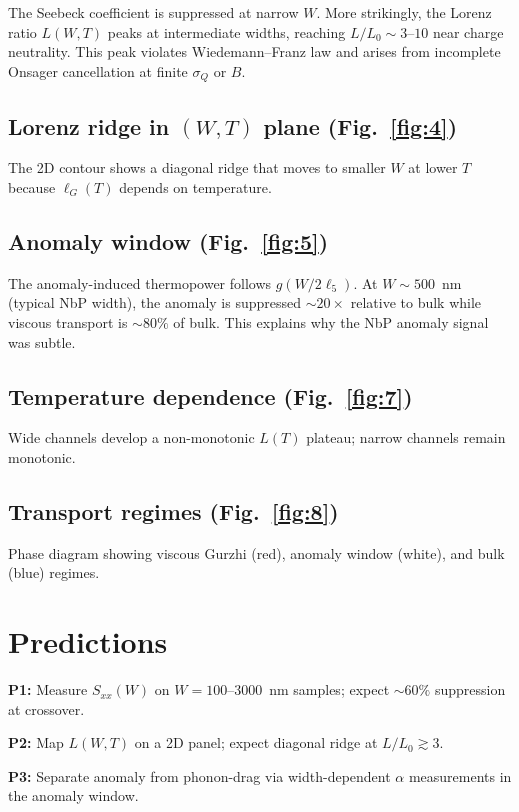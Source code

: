 \documentclass[twocolumn,11pt]{article}
\begin{document}
The Seebeck coefficient is suppressed at narrow $W$. More strikingly, the Lorenz 
ratio $L(W,T)$ peaks at intermediate widths, reaching $L/L_0 \sim 3$--$10$ near charge 
neutrality. This peak violates Wiedemann--Franz law and arises from incomplete Onsager 
cancellation \citep{Messica2023} at finite $\sigma_Q$ or $B$.

\subsection{Lorenz ridge in $(W,T)$ plane (Fig.~\ref{fig:4})}

The 2D contour shows a diagonal ridge that moves to smaller $W$ at lower $T$ because 
$\ell_G(T)$ depends on temperature.

\subsection{Anomaly window (Fig.~\ref{fig:5})}

The anomaly-induced thermopower follows $g(W/2\ell_5)$. At $W\sim500$~nm (typical 
NbP width), the anomaly is suppressed $\sim20\times$ relative to bulk while viscous 
transport is $\sim80\%$ of bulk. This explains why the NbP anomaly signal was subtle.

\subsection{Temperature dependence (Fig.~\ref{fig:7})}

Wide channels develop a non-monotonic $L(T)$ plateau; narrow channels remain monotonic.

\subsection{Transport regimes (Fig.~\ref{fig:8})}

Phase diagram showing viscous Gurzhi (red), anomaly window (white), and bulk (blue) regimes.

\section{Predictions}

\textbf{P1:} Measure $S_{xx}(W)$ on $W=100$--$3000$~nm samples; expect $\sim60\%$ suppression 
at crossover.

\textbf{P2:} Map $L(W,T)$ on a 2D panel; expect diagonal ridge at $L/L_0\gtrsim3$.

\textbf{P3:} Separate anomaly from phonon-drag via width-dependent $\alpha$ measurements 
in the anomaly window.
\end{document}
